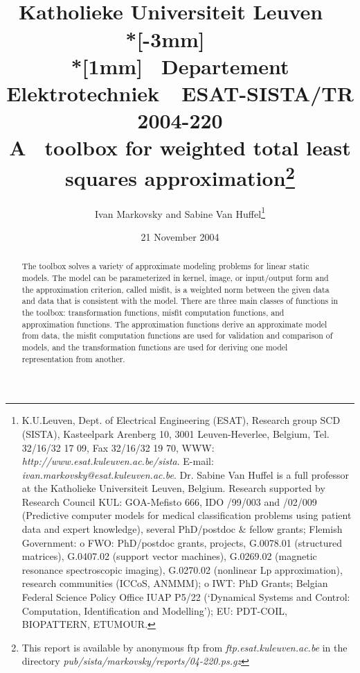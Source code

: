 \documentclass[11pt,titlepage]{article}
\title{     \ \vspace{-8cm} \\
            {\Large\bf \ 
        Katholieke Universiteit Leuven \hfill \ \  }\\*[-3mm] 
             \ \hrulefill \  \\*[1mm]
             \large\ 
        Departement Elektrotechniek\ \hfill \ ESAT-SISTA/TR 2004-220 \\
             \protect{\vspace*{4cm}} 
             \Large 
        A \matlab\ toolbox for weighted total least squares approximation\thanks{ \protect\small
                                                 \protect\parbox[t]{12cm}{
             This report is available by anonymous ftp from 
             {\it ftp.esat.kuleuven.ac.be} in the directory 
             {\it pub/sista/markovsky/reports/04-220.ps.gz}  }} 
      }
\author{Ivan Markovsky and Sabine Van Huffel\thanks{ \protect\small
                                 \protect\parbox[t]{12cm}{
              K.U.Leuven, Dept. of Electrical Engineering (ESAT),
              Research group SCD (SISTA),
              Kasteelpark Arenberg 10,
              3001 Leuven-Heverlee, Belgium, \newline
              Tel. 32/16/32 17 09, Fax 32/16/32 19 70,  \newline
              WWW: {\it http://www.esat.kuleuven.ac.be/sista}. \newline
              E-mail: {\it ivan.markovsky@esat.kuleuven.ac.be}.
Dr. Sabine Van Huffel is a full professor at the Katholieke Universiteit Leuven, Belgium. Research supported by
Research Council KUL: GOA-Mefisto 666, IDO /99/003 and /02/009 (Predictive computer models for medical classification problems using patient data and expert knowledge), several PhD/postdoc \& fellow grants;  Flemish Government: o FWO: PhD/postdoc grants, projects, G.0078.01 (structured matrices), G.0407.02 (support vector machines), G.0269.02 (magnetic resonance spectroscopic imaging), G.0270.02 (nonlinear Lp approximation), research communities (ICCoS, ANMMM); o IWT: PhD Grants;  Belgian Federal Science Policy Office IUAP P5/22 (`Dynamical Systems and Control: Computation, Identification and Modelling');  EU: PDT-COIL, BIOPATTERN, ETUMOUR.
       }}}
\date{21 November 2004}
\begin{document}
\maketitle

\begin{abstract}
The toolbox solves a variety of approximate modeling problems for linear static models. The model can be parameterized in kernel, image, or input/output form and the approximation criterion, called misfit, is a weighted norm between the given data and data that is consistent with the model. There are three main classes of functions in the toolbox: transformation functions, misfit computation functions, and approximation functions. The approximation functions derive an approximate model from data, the misfit computation functions are used for validation and comparison of models, and the transformation functions are used for deriving one model representation from another.
\end{abstract}
\end{document}
